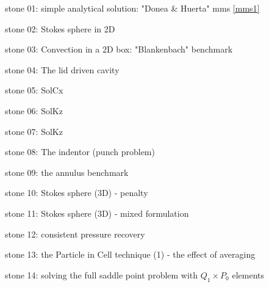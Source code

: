 

{\small 

\noindent stone 01: simple analytical solution: "Donea \& Huerta" mms \ref{mms1} 


\noindent stone 02: Stokes sphere in 2D 


\noindent stone 03: Convection in a 2D box: "Blankenbach" benchmark \cite{blbc89}


\noindent stone 04: The lid driven cavity


\noindent stone 05: SolCx


\noindent stone 06: SolKz


\noindent stone 07: SolKz


\noindent stone 08: The indentor (punch problem) 


\noindent stone 09: the annulus benchmark 


\noindent stone 10: Stokes sphere (3D) - penalty


\noindent stone 11: Stokes sphere (3D) - mixed formulation


\noindent stone 12: consistent pressure recovery 


\noindent stone 13: the Particle in Cell technique (1) - the effect of averaging


\noindent stone 14: solving the full saddle point problem with $Q_1\times P_0$ elements 


}
